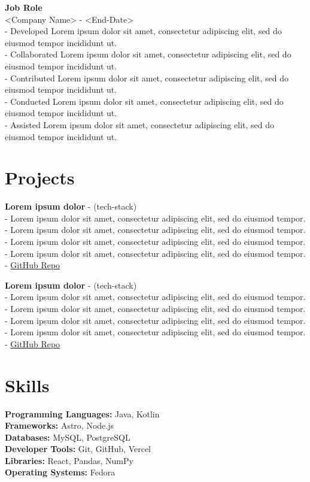 \documentclass[a4paper,11pt]{article}
\begin{document}
	\textbf{Job Role}\\
	<Company Name> \hfill <Start-Date> - <End-Date>\\
	- Developed Lorem ipsum dolor sit amet, consectetur adipiscing elit, sed do eiusmod tempor incididunt ut.\\
	- Collaborated Lorem ipsum dolor sit amet, consectetur adipiscing elit, sed do eiusmod tempor incididunt ut.\\
	- Contributed Lorem ipsum dolor sit amet, consectetur adipiscing elit, sed do eiusmod tempor incididunt ut.\\
	- Conducted Lorem ipsum dolor sit amet, consectetur adipiscing elit, sed do eiusmod tempor incididunt ut.\\
	- Assisted Lorem ipsum dolor sit amet, consectetur adipiscing elit, sed do eiusmod tempor incididunt ut.
	\vspace{-0.3cm}
	\section*{Projects}
	\textbf{Lorem ipsum dolor} - (tech-stack)\\
	- Lorem ipsum dolor sit amet, consectetur adipiscing elit, sed do eiusmod tempor.\\
	- Lorem ipsum dolor sit amet, consectetur adipiscing elit, sed do eiusmod tempor.\\
	- Lorem ipsum dolor sit amet, consectetur adipiscing elit, sed do eiusmod tempor. \\
	- Lorem ipsum dolor sit amet, consectetur adipiscing elit, sed do eiusmod tempor. \\
	- \href{https://github.com/Lorem/lorem-ipsum-dolor}{GitHub Repo}
	
	\textbf{Lorem ipsum dolor} - (tech-stack)\\
	- Lorem ipsum dolor sit amet, consectetur adipiscing elit, sed do eiusmod tempor.\\
	- Lorem ipsum dolor sit amet, consectetur adipiscing elit, sed do eiusmod tempor.\\
	- Lorem ipsum dolor sit amet, consectetur adipiscing elit, sed do eiusmod tempor. \\
	- Lorem ipsum dolor sit amet, consectetur adipiscing elit, sed do eiusmod tempor. \\
	- \href{https://github.com/Lorem/lorem-ipsum-dolor}{GitHub Repo}
	\vspace{-0.3cm}
	\section*{Skills}
	\textbf{Programming Languages:} Java, Kotlin \\
	\textbf{Frameworks:} Astro, Node.js \\
	\textbf{Databases:} MySQL, PostgreSQL \\
	\textbf{Developer Tools:} Git, GitHub, Vercel \\
	\textbf{Libraries:} React, Pandas, NumPy \\
	\textbf{Operating Systems:} Fedora
\end{document}
